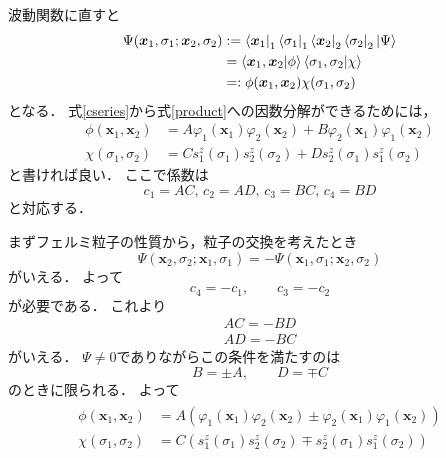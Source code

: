 \documentclass[a4paper,11pt]{jsarticle}
\begin{document}
波動関数に直すと
\begin{align}
  \Psi(\bm{x}_1, \sigma_1; \bm{x}_2, \sigma_2) 
  &:= \bra{\bm{x}_1}_1\bra{\sigma_1}_1\bra{\bm{x}_2}_2\bra{\sigma_2}_2 \ket{\Psi} \notag\\
  &= \braket{\bm{x}_1, \bm{x}_2}{\phi} \braket{\sigma_1, \sigma_2}{\chi} \notag\\
  &=: \phi(\bm{x}_1, \bm{x}_2) \chi(\sigma_1, \sigma_2)
  \label{product}
\end{align}
となる．
式\eqref{cseries}から式\eqref{product}への因数分解ができるためには，
\begin{align}
  \phi(\bm{x}_1, \bm{x}_2) &= A \varphi_1(\bm{x}_1) \varphi_2(\bm{x}_2) + B \varphi_2(\bm{x}_1) \varphi_1(\bm{x}_2) \\
  \chi(\sigma_1,\sigma_2) &= C s^z_1(\sigma_1) s^z_2(\sigma_2) + D s^z_2(\sigma_1) s^z_1(\sigma_2)
\end{align}
と書ければ良い．
ここで係数は
\begin{equation}
  c_1 = AC, \,c_2 = AD,\,c_3 = BC,\,c_4 = BD
\end{equation}
と対応する．

まずフェルミ粒子の性質から，粒子の交換を考えたとき
\begin{equation}
  \Psi(\bm{x}_2, \sigma_2; \bm{x}_1, \sigma_1) = - \Psi(\bm{x}_1, \sigma_1; \bm{x}_2, \sigma_2) 
\end{equation}
がいえる．
よって
\begin{equation}
  c_4 = - c_1,\qquad c_3 = - c_2 
\end{equation}
が必要である．
これより
\begin{align}
  AC = - BD \\
  AD = - BC 
\end{align}
がいえる．
$\Psi\neq 0$でありながらこの条件を満たすのは
\begin{equation}
  B = \pm A, \qquad  D = \mp C 
\end{equation}
のときに限られる．
よって
\begin{align}
  \begin{split}
    \phi(\bm{x}_1, \bm{x}_2) &= A\left(\varphi_1(\bm{x}_1) \varphi_2(\bm{x}_2) \pm \varphi_2(\bm{x}_1) \varphi_1(\bm{x}_2)\right)  \\
    \chi(\sigma_1,\sigma_2) &= C \left(s^z_1(\sigma_1) s^z_2(\sigma_2) \mp s^z_2(\sigma_1) s^z_1(\sigma_2)\right)
    \label{pmmp}    
  \end{split}
\end{align}
\end{document}
